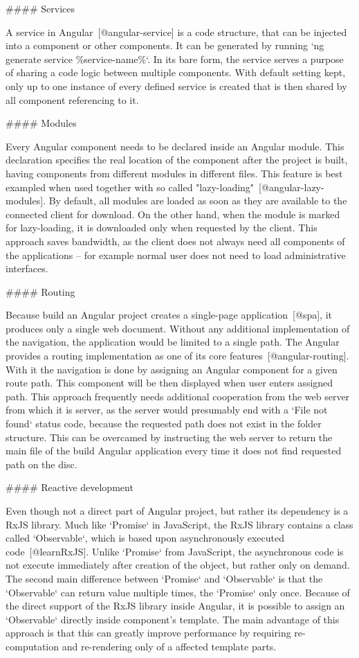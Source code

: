 \documentclass[
  digital, %
  oneside, %
  lof,     %
  lot,     %
]{fithesis4}
\begin{document}
{#### Services

A service in Angular~[@angular-service] is a code structure, that can be injected into a component or other components. It can be generated by running `ng generate service \%service-name\%`. In its bare form, the service serves a purpose of sharing a code logic between multiple components. With default setting kept, only up to one instance of every defined service is created that is then shared by all component referencing to it.

#### Modules

Every Angular component needs to be declared inside an Angular module. This declaration specifies the real location of the component after the project is built, having components from different modules in different files. This feature is best exampled when used together with so called "lazy-loading"~[@angular-lazy-modules]. By default, all modules are loaded as soon as they are available to the connected client for download. On the other hand, when the module is marked for lazy-loading, it is downloaded only when requested by the client. This approach saves bandwidth, as the client does not always need all components of the applications -- for example normal user does not need to load administrative interfaces.


#### Routing

Because build an Angular project creates a single-page application~[@spa], it produces only a single web document. Without any additional implementation of the navigation, the application would be limited to a single path. The Angular provides a routing implementation as one of its core features~[@angular-routing]. With it the navigation is done by assigning an Angular component for a given route path. This component will be then displayed when user enters assigned path. This approach frequently needs additional cooperation from the web server from which it is server, as the server would presumably end with a `File not found` status code, because the requested path does not exist in the folder structure. This can be overcamed by instructing the web server to return the main file of the build Angular application every time it does not find requested path on the disc.


#### Reactive development

Even though not a direct part of Angular project, but rather its dependency is a RxJS library. Much like `Promise` in JavaScript, the RxJS library contains a class called `Observable`, which is based upon asynchronously executed code~[@learnRxJS]. Unlike `Promise` from JavaScript, the asynchronous code is not execute immediately after creation of the object, but rather only on demand. The second main difference between `Promise` and `Observable` is that the `Observable` can return value multiple times, the `Promise` only once. Because of the direct support of the RxJS library inside Angular, it is possible to assign an `Observable` directly inside component's template. The main advantage of this approach is that this can greatly improve performance by requiring re-computation and re-rendering only of a affected template parts.

}
\end{document}
